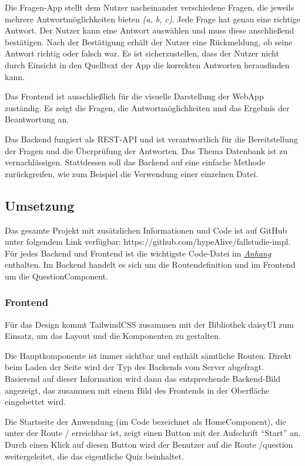 \documentclass[biblatex]{lni}
\begin{document}
Die Fragen-App stellt dem Nutzer nacheinander verschiedene Fragen,
die jeweils mehrere Antwortmöglichkeiten bieten \textit{(a, b, c)}.
Jede Frage hat genau eine richtige Antwort.
Der Nutzer kann eine Antwort auswählen und muss diese anschließend bestätigen.
Nach der Bestätigung erhält der Nutzer eine Rückmeldung,
ob seine Antwort richtig oder falsch war.
Es ist sicherzustellen, dass der Nutzer nicht durch Einsicht in den Quelltext der App die korrekten Antworten herausfinden kann.

Das Frontend ist ausschließlich für die visuelle Darstellung der \ac{WebApp} zuständig.
Es zeigt die Fragen, die Antwortmöglichkeiten und das Ergebnis der Beantwortung an.

Das Backend fungiert als \ac{REST}-\ac{API} und ist verantwortlich für die Bereitstellung der Fragen und die Überprüfung der Antworten.
Das Thema Datenbank ist zu vernachlässigen.
Stattdessen soll das Backend auf eine einfache Methode zurückgreifen, wie zum Beispiel die Verwendung einer einzelnen Datei.

\subsection{Umsetzung}

Das gesamte Projekt mit zusätzlichen Informationen und Code ist auf GitHub unter folgendem Link verfügbar: https://github.com/hypeAlive/fallstudie-impl. \cite{fImpl}
Für jedes Backend und Frontend ist die wichtigste Code-Datei im \hyperref[sec:anhang]{\textit{Anhang}} enthalten.
Im Backend handelt es sich um die Routendefinition und im Frontend um die QuestionComponent.

\subsubsection{Frontend}

Für das Design kommt Tailwind\ac{CSS} zusammen mit der Bibliothek daisyUI zum Einsatz,
um das Layout und die Komponenten zu gestalten.

Die Hauptkomponente ist immer sichtbar und enthält sämtliche Routen.
Direkt beim Laden der Seite wird der Typ des Backends vom Server abgefragt.
Basierend auf dieser Information wird dann das entsprechende Backend-Bild angezeigt,
das zusammen mit einem Bild des Frontends in der Oberfläche eingebettet wird.

Die Startseite der Anwendung (im Code bezeichnet als HomeComponent),
die unter der Route / erreichbar ist, zeigt einen Button mit der Aufschrift “Start” an.
Durch einen Klick auf diesen Button wird der Benutzer auf die Route /question weitergeleitet,
die das eigentliche Quiz beinhaltet.
\end{document}

